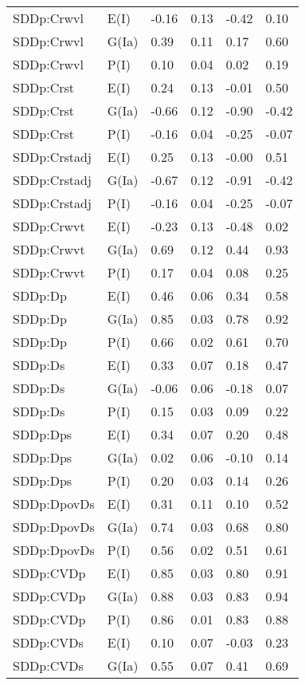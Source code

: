 \begin{center}
\begin{longtable}{|p{1.1in}|p{0.7in}|p{0.7in}|p{0.6in}|p{0.6in}|p{0.6in}|}
  SDDp:Crwvl & E(I) & -0.16 & 0.13 & -0.42 & 0.10 \\ 
  SDDp:Crwvl & G(Ia) & 0.39 & 0.11 & 0.17 & 0.60 \\ 
  SDDp:Crwvl & P(I) & 0.10 & 0.04 & 0.02 & 0.19 \\ 
  SDDp:Crst & E(I) & 0.24 & 0.13 & -0.01 & 0.50 \\ 
  SDDp:Crst & G(Ia) & -0.66 & 0.12 & -0.90 & -0.42 \\ 
  SDDp:Crst & P(I) & -0.16 & 0.04 & -0.25 & -0.07 \\ 
  SDDp:Crstadj & E(I) & 0.25 & 0.13 & -0.00 & 0.51 \\ 
  SDDp:Crstadj & G(Ia) & -0.67 & 0.12 & -0.91 & -0.42 \\ 
  SDDp:Crstadj & P(I) & -0.16 & 0.04 & -0.25 & -0.07 \\ 
  SDDp:Crwvt & E(I) & -0.23 & 0.13 & -0.48 & 0.02 \\ 
  SDDp:Crwvt & G(Ia) & 0.69 & 0.12 & 0.44 & 0.93 \\ 
  SDDp:Crwvt & P(I) & 0.17 & 0.04 & 0.08 & 0.25 \\ 
  SDDp:Dp & E(I) & 0.46 & 0.06 & 0.34 & 0.58 \\ 
  SDDp:Dp & G(Ia) & 0.85 & 0.03 & 0.78 & 0.92 \\ 
  SDDp:Dp & P(I) & 0.66 & 0.02 & 0.61 & 0.70 \\ 
  SDDp:Ds & E(I) & 0.33 & 0.07 & 0.18 & 0.47 \\ 
  SDDp:Ds & G(Ia) & -0.06 & 0.06 & -0.18 & 0.07 \\ 
  SDDp:Ds & P(I) & 0.15 & 0.03 & 0.09 & 0.22 \\ 
  SDDp:Dps & E(I) & 0.34 & 0.07 & 0.20 & 0.48 \\ 
  SDDp:Dps & G(Ia) & 0.02 & 0.06 & -0.10 & 0.14 \\ 
  SDDp:Dps & P(I) & 0.20 & 0.03 & 0.14 & 0.26 \\ 
  SDDp:DpovDs & E(I) & 0.31 & 0.11 & 0.10 & 0.52 \\ 
  SDDp:DpovDs & G(Ia) & 0.74 & 0.03 & 0.68 & 0.80 \\ 
  SDDp:DpovDs & P(I) & 0.56 & 0.02 & 0.51 & 0.61 \\ 
  SDDp:CVDp & E(I) & 0.85 & 0.03 & 0.80 & 0.91 \\ 
  SDDp:CVDp & G(Ia) & 0.88 & 0.03 & 0.83 & 0.94 \\ 
  SDDp:CVDp & P(I) & 0.86 & 0.01 & 0.83 & 0.88 \\ 
  SDDp:CVDs & E(I) & 0.10 & 0.07 & -0.03 & 0.23 \\ 
  SDDp:CVDs & G(Ia) & 0.55 & 0.07 & 0.41 & 0.69 \\ 

\end{longtable}
\end{center}
